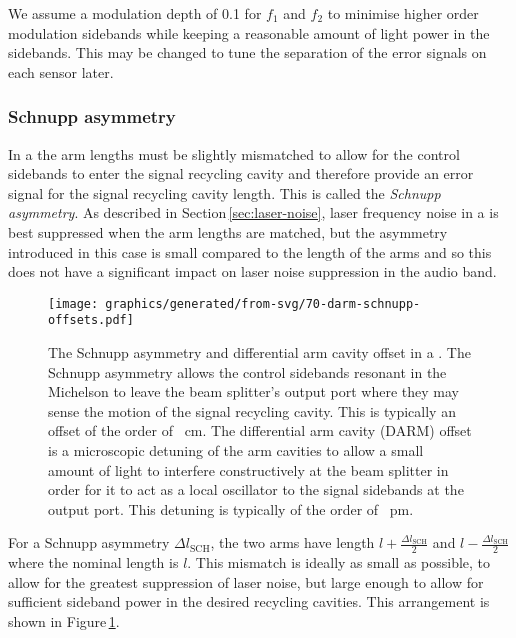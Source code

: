 We assume a modulation depth of \num{0.1} for $f_1$ and $f_2$ to minimise higher order modulation sidebands while keeping a reasonable amount of light power in the sidebands. This may be changed to tune the separation of the error signals on each sensor later.

\subsubsection{Schnupp asymmetry}
In a \DRFPMI{} the arm lengths must be slightly mismatched to allow for the control sidebands to enter the signal recycling cavity and therefore provide an error signal for the signal recycling cavity length. This is called the \emph{Schnupp asymmetry}. As described in Section\,\ref{sec:laser-noise}, laser frequency noise in a \MI{} is best suppressed when the arm lengths are matched, but the asymmetry introduced in this case is small compared to the length of the arms and so this does not have a significant impact on laser noise suppression in the audio band.

\begin{figure}
  \centering
  \texttt{[image: graphics/generated/from-svg/70-darm-schnupp-offsets.pdf]}
  \caption[Schnupp asymmetry and differential arm cavity offset in a \DRFPMI{}]{\label{fig:schnupp-darm-offsets}The Schnupp asymmetry and differential arm cavity offset in a \DRFPMI{}. The Schnupp asymmetry allows the control sidebands resonant in the Michelson to leave the beam splitter's output port where they may sense the motion of the signal recycling cavity. This is typically an offset of the order of \SI{}{\centi\meter}. The differential arm cavity (\gls{DARM}) offset is a microscopic detuning of the arm cavities to allow a small amount of light to interfere constructively at the beam splitter in order for it to act as a local oscillator to the signal sidebands at the output port. This detuning is typically of the order of \SI{}{\pico\meter}.}
\end{figure}

For a Schnupp asymmetry $\Delta l_{\text{SCH}}$, the two arms have length $l + \frac{\Delta l_{\text{SCH}}}{2}$ and $l - \frac{\Delta l_{\text{SCH}}}{2}$ where the nominal length is $l$. This mismatch is ideally as small as possible, to allow for the greatest suppression of laser noise, but large enough to allow for sufficient sideband power in the desired recycling cavities. This arrangement is shown in Figure\,\ref{fig:schnupp-darm-offsets}.

